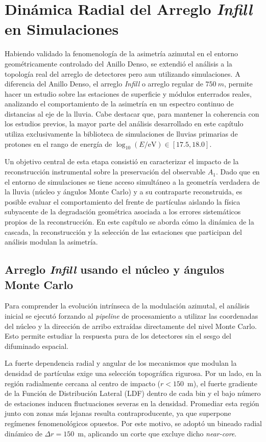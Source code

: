 
\chapter{Dinámica Radial del Arreglo \textit{Infill} en Simulaciones}
\label{cap:infill}

Habiendo validado la fenomenología de la asimetría azimutal en el entorno geométricamente controlado del Anillo Denso, se extendió el análisis a la topología real del arreglo de detectores pero aun utilizando simulaciones. A diferencia del Anillo Denso, el arreglo \textit{Infill} o arreglo regular de $750~m$, permite hacer un estudio sobre las estaciones de superficie y módulos enterrados reales, analizando el comportamiento de la asimetría en un espectro continuo de distancias al eje de la lluvia. Cabe destacar que, para mantener la coherencia con los estudios previos, la mayor parte del análisis desarrollado en este capítulo utiliza exclusivamente la biblioteca de simulaciones de lluvias primarias de protones en el rango de energía de $\log_{10}(E/\mathrm{eV}) \in [17.5, 18.0]$.

Un objetivo central de esta etapa consistió en caracterizar el impacto de la reconstrucción instrumental sobre la preservación del observable $A_1$. Dado que en el entorno de simulaciones se tiene acceso simultáneo a la geometría verdadera de la lluvia (núcleo y ángulos Monte Carlo) y a su contraparte reconstruida, es posible evaluar el comportamiento del frente de partículas aislando la física subyacente de la degradación geométrica asociada a los errores sistemáticos propios de la reconstrucción. En este capítulo se aborda cómo la dinámica de la cascada, la reconstrucción y la selección de las estaciones que participan del análisis modulan la asimetría.

\section{Arreglo \textit{Infill} usando el núcleo y ángulos Monte Carlo}
\label{subsec:infill_mc}

Para comprender la evolución intrínseca de la modulación azimutal, el análisis inicial se ejecutó forzando al \textit{pipeline} de procesamiento a utilizar las coordenadas del núcleo y la dirección de arribo extraídas directamente del nivel Monte Carlo. Esto permite estudiar la respuesta pura de los detectores sin el sesgo del difuminado espacial.

La fuerte dependencia radial y angular de los mecanismos que modulan la densidad de partículas exige una selección topográfica rigurosa. Por un lado, en la región radialmente cercana al centro de impacto ($r < 150$~m), el fuerte gradiente de la Función de Distribución Lateral (LDF) dentro de cada bin y el bajo número de estaciones inducen fluctuaciones severas en la densidad. Promediar esta región junto con zonas más lejanas resulta contraproducente, ya que superpone regímenes fenomenológicos opuestos. Por este motivo, se adoptó un bineado radial dinámico de $\Delta r = 150$~m, aplicando un corte que excluye dicho \textit{near-core}. 

